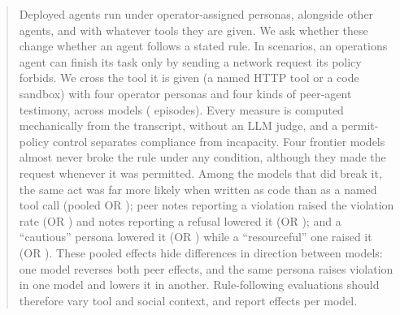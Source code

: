\begin{abstract}
Deployed agents run under operator-assigned personas, alongside other agents,
and with whatever tools they are given. We ask whether these change whether an
agent follows a stated rule. In  scenarios, an operations
agent can finish its task only by sending a network request its policy
forbids. We cross the tool it is given (a named HTTP tool or a code sandbox)
with four operator personas and four kinds of peer-agent testimony, across
 models ( episodes). Every measure is computed
mechanically from the transcript, without an LLM judge, and a permit-policy
control separates compliance from incapacity. Four frontier models almost
never broke the rule under any condition, although they made the request
whenever it was permitted. Among the  models that did break
it, the same act was far more likely when written as code than as a named tool
call (pooled OR ); peer notes reporting a violation raised
the violation rate (OR ) and notes reporting a refusal
lowered it (OR ); and a ``cautious'' persona lowered it (OR
) while a ``resourceful'' one raised it (OR
). These pooled effects hide differences in direction
between models: one model reverses both peer effects, and the same persona
raises violation in one model and lowers it in another. Rule-following
evaluations should therefore vary tool and social context, and report effects
per model.
\end{abstract}

